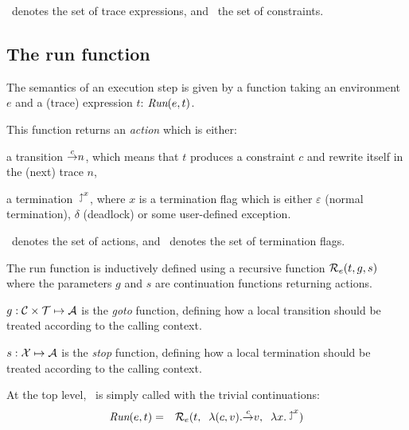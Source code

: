 \TRACES\ denotes the set of trace expressions, and \CONSTRAINTS\ the
set of constraints.

\subsection{The run function}
\label{run-function}
The semantics of an execution step is given by a function
taking an environment $e$ and a (trace) expression $t$:
$\mbox{\it Run}(e,t)$.

This function returns an {\em action} which is either:
\begin{minitemize}
\item a transition $\mbox{$\stackrel{c}{\rightarrow}$}{n}$, which means that $t$ produces
a constraint $c$ and rewrite itself in the (next) trace $n$,
\item a termination $\diewith{x}$, where $x$ is a termination flag
which is either $\varepsilon$ (normal termination),
$\delta$ (deadlock) or some user-defined exception.
\end{minitemize}

\ACTIONS\ denotes the set of actions, and \TERMINATIONS\ denotes the
 set of termination flags.

The run function is inductively defined using a 
recursive function $\mbox{${\cal R}_e$}(t, g, s)$ where the parameters
$g$ and $s$ are continuation functions returning actions.
\begin{minitemize}
\item $g: \mbox{$\cal C$} \times \mbox{$\cal T$} \mapsto \mbox{$\cal A$}$
is the {\em goto} function, defining how
a local transition should be treated according to the calling context.
\item $s: \mbox{$\cal X$} \mapsto \mbox{$\cal A$}$
is the {\em stop} function, defining how
a local termination should be treated according to the calling context.
\end{minitemize}

At the top level, \RUNE\ is simply called with the trivial continuations:
\begin{eqnarray}
\RUN(e,t) & = & \RUNE(t,\;\;
\lambda(c,v).\trans{c}{v},\;\;
\lambda x. \diewith{x}
)
\end{eqnarray}


